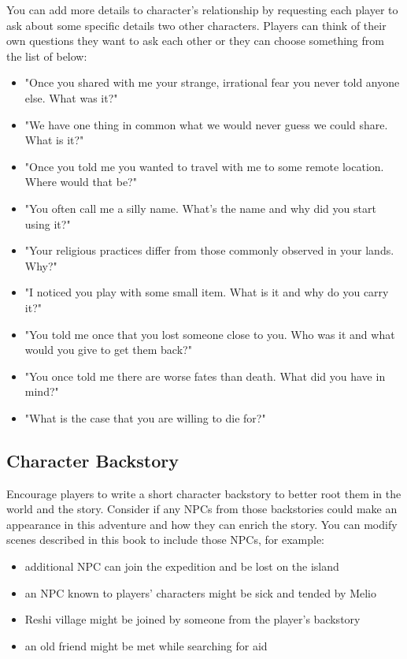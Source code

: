 You can add more details to character's relationship by requesting each player to ask about some specific details two other characters. Players can think of their own questions they want to ask each other or they can choose something from the list of below:

\begin{itemize}
	\item "Once you shared with me your strange, irrational fear you never told anyone else. What was it?"
	\item "We have one thing in common what we would never guess we could share. What is it?"
	\item "Once you told me you wanted to travel with me to some remote location. Where would that be?"
	\item "You often call me a silly name. What's the name and why did you start using it?"
	\item "Your religious practices differ from those commonly observed in your lands. Why?"
	\item "I noticed you play with some small item. What is it and why do you carry it?"
	\item "You told me once that you lost someone close to you. Who was it and what would you give to get them back?"
	\item "You once told me there are worse fates than death. What did you have in mind?"
	\item "What is the case that you are willing to die for?"
\end{itemize}

\subsection{Character Backstory}

Encourage players to write a short character backstory to better root them in the world and the story. Consider if any NPCs from those backstories could make an appearance in this adventure and how they can enrich the story. You can modify scenes described in this book to include those NPCs, for example:
\begin{itemize}
	\item additional NPC can join the expedition and be lost on the island
	\item an NPC known to players’ characters might be sick and tended by Melio
	\item Reshi village might be joined by someone from the player’s backstory
	\item an old friend might be met while searching for aid
\end{itemize}


